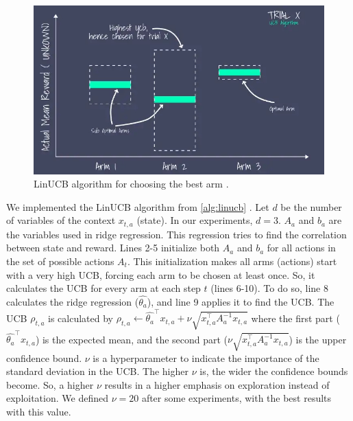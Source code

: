 \begin{figure}[!htb]
    \centering
    \includegraphics[scale=0.58]{Images/Learning_compensations/linucb.jpg}
    \caption[LinUCB algorithm for choosing the best arm.]{LinUCB algorithm for choosing the best arm \cite{recommender2020}.}
    \label{fig:linucb}
\end{figure}

We implemented the LinUCB algorithm from \ref{alg:linucb} \cite{recommender2020}. Let $d$ be the number of variables of the context $x_{t,a}$ (state). In our experiments, $d=3$. $A_a$ and $b_a$ are the variables used in ridge regression. This regression tries to find the correlation between state and reward. Lines 2-5 initialize both $A_a$ and $b_a$ for all actions in the set of possible actions $A_t$. This initialization makes all arms (actions) start with a very high UCB, forcing each arm to be chosen at least once. So, it calculates the UCB for every arm at each step $t$ (lines 6-10). To do so, line 8 calculates the ridge regression ($\hat{\theta_a}$), and line 9 applies it to find the UCB. The UCB $\rho_{t, a}$ is calculated by $\rho_{t, a} \leftarrow \hat{\theta_a}^\top x_{t,a} + \nu \sqrt{x_{t,a}^\top A_{a}^{-1} x_{t,a}}$ where the first part ($\hat{\theta_a}^\top x_{t,a}$) is the expected mean, and the second part ($\nu \sqrt{x_{t,a}^\top A_{a}^{-1} x_{t,a}}$) is the upper confidence bound. $\nu$ is a hyperparameter to indicate the importance of the standard deviation in the UCB. The higher $\nu$ is, the wider the confidence bounds become. So, a higher $\nu$ results in a higher emphasis on exploration instead of exploitation. We defined $\nu = 20$ after some experiments, with the best results with this value.

